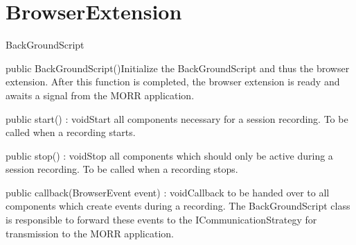 \section{BrowserExtension}
\begin{class}{BackGroundScript}


\begin{constructors}
\begin{constructor}{public BackGroundScript()}{Initialize the BackGroundScript and thus the browser extension. After this function is completed, the browser extension is ready and awaits a signal from the MORR application.}
\end{constructor}
\end{constructors}
\begin{methods}
\begin{method}{public start() : void}{Start all components necessary for a session recording. To be called when a recording starts.}
\end{method}
\begin{method}{public stop() : void}{Stop all components which should only be active during a session recording. To be called when a recording stops.}
\end{method}
\begin{method}{public callback(BrowserEvent event) : void}{Callback to be handed over to all components which create events during a recording. The BackGroundScript class is responsible to forward these events to the ICommunicationStrategy for transmission to the MORR application.}
\begin{parameters}
\end{parameters}
\end{method}
\end{methods}
\end{class}
\newpage
